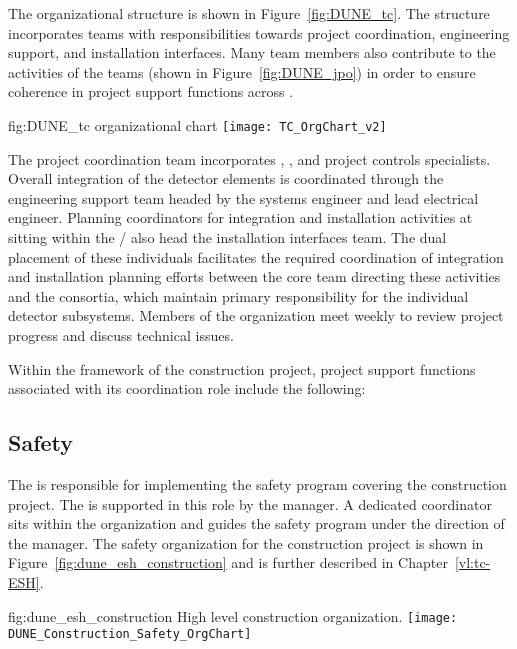 The   organizational structure is shown 
in Figure~\ref{fig:DUNE_tc}.  The structure incorporates teams 
with responsibilities towards project coordination, engineering 
support, and installation interfaces.  Many  team 
members also contribute to the activities of the  
teams (shown in Figure~\ref{fig:DUNE_jpo}) in order to ensure 
coherence in project support functions across .
\begin{dunefigure}{fig:DUNE_tc}
  {  organizational chart}
  \texttt{[image: TC\_OrgChart\_v2]}
\end{dunefigure}
The  project coordination team incorporates , 
, and project controls specialists.  Overall integration 
of the detector elements is coordinated through the  
engineering support team headed by the  systems 
engineer and lead  electrical engineer.  Planning 
coordinators for integration and installation activities at 
 sitting within the /  also head the  installation interfaces team.  
The dual placement of these individuals facilitates the required 
coordination of integration and installation planning efforts between 
the core team directing these activities and the  
consortia, which maintain primary responsibility for the individual 
detector subsystems.  Members of the  organization meet 
weekly to review project progress and discuss technical issues. 
     
Within the framework of the   construction 
project,  project support functions associated with its 
coordination role include the following:

\subsection{Safety}
\label{sec:tc_safety}

The  is responsible for implementing the safety program
covering the  construction project.  The  is
supported in this role by the  
manager.  A dedicated   coordinator sits within
the  organization and guides the  safety program
under the direction of the   manager. The
safety organization for the  construction project is shown
in Figure~\ref{fig:dune_esh_construction} and is further described in
Chapter~\ref{vl:tc-ESH}.
\begin{dunefigure}{fig:dune_esh_construction}
  {High level  construction  organization.}
  \texttt{[image: DUNE\_Construction\_Safety\_OrgChart]}
\end{dunefigure}

